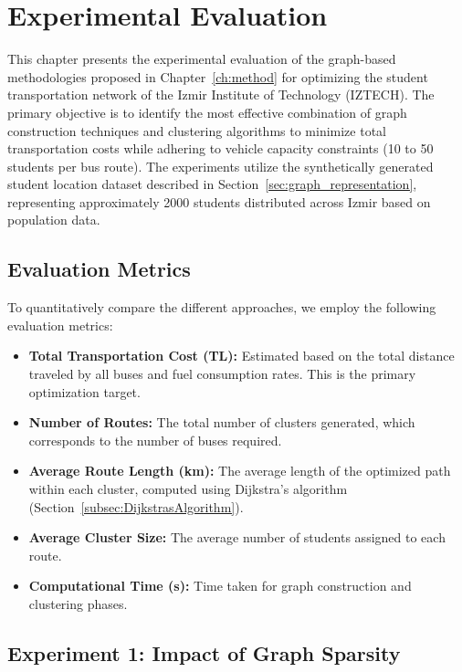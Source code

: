 \chapter{Experimental Evaluation}
\label{ch:experiments}

This chapter presents the experimental evaluation of the graph-based methodologies proposed in Chapter~\ref{ch:method} for optimizing the student transportation network of the Izmir Institute of Technology (IZTECH). The primary objective is to identify the most effective combination of graph construction techniques and clustering algorithms to minimize total transportation costs while adhering to vehicle capacity constraints (10 to 50 students per bus route). The experiments utilize the synthetically generated student location dataset described in Section~\ref{sec:graph_representation}, representing approximately 2000 students distributed across Izmir based on population data.

\section{Evaluation Metrics}
\label{sec:eval_metrics}

To quantitatively compare the different approaches, we employ the following evaluation metrics:
\begin{itemize}
    \item \textbf{Total Transportation Cost (TL):} Estimated based on the total distance traveled by all buses and fuel consumption rates. This is the primary optimization target.
    \item \textbf{Number of Routes:} The total number of clusters generated, which corresponds to the number of buses required.
    \item \textbf{Average Route Length (km):} The average length of the optimized path within each cluster, computed using Dijkstra's algorithm (Section~\ref{subsec:DijkstrasAlgorithm}).
    \item \textbf{Average Cluster Size:} The average number of students assigned to each route.
    \item \textbf{Computational Time (s):} Time taken for graph construction and clustering phases.
\end{itemize}

\section{Experiment 1: Impact of Graph Sparsity}
\label{sec:exp_sparsity}


